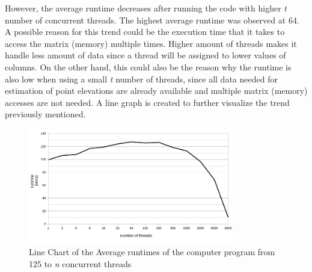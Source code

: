 \documentclass{article}
\begin{document}
\indent However, the average runtime decreases after running the code with higher \emph{t} number of concurrent threads. The highest average runtime was observed at 64. A possible reason for this trend could be the execution time that it takes to access the matrix (memory) multiple times. Higher amount of threads makes it handle less amount of data since a thread will be assigned to lower values of columns. On the other hand, this could also be the reason why the runtime is also low when using a small \emph{t} number of threads, since all data needed for estimation of point elevations are already available and multiple matrix (memory) accesses are not needed. A line graph is created to further visualize the trend previously mentioned.
\begin{figure}[H]
    \includegraphics[width=0.8\textwidth]{chart02.png}
    \centering
    \caption{Line Chart of the Average runtimes of the computer program from 125 to \emph{n} concurrent threads}
    \end{figure}
    
\end{document}
